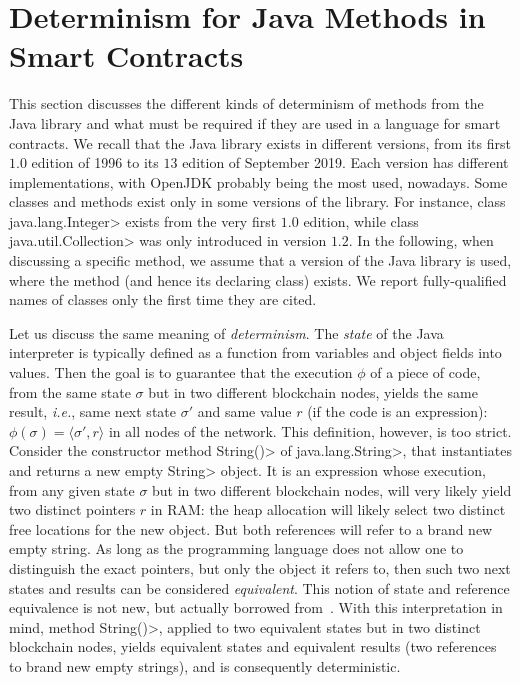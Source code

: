 \section{Determinism for Java Methods in Smart Contracts}\label{sec:determinism}

This section discusses the different kinds of determinism of methods from
the Java library and what must be required if they are used
in a language for smart contracts.
We recall that the Java library exists in different versions, from its first
$1.0$ edition of 1996 to its $13$ edition of September 2019.
Each version has different implementations, with OpenJDK probably being
the most used, nowadays. Some classes and methods exist only in some versions of the library.
For instance, class \<java.lang.Integer> exists from the very first $1.0$ edition,
while class \<java.util.Collection> was only introduced in version $1.2$.
In the following, when discussing a specific method, we assume that a version
of the Java library is used, where the method (and hence its declaring class) exists.
We report fully-qualified names of classes only the first time they are cited.

Let us discuss the same meaning of \emph{determinism}.
The \emph{state} of the Java interpreter is typically defined
as a function from variables and object fields into values.
Then the goal is to guarantee that the execution $\phi$ of a piece of code,
from the same state $\sigma$ but in two different blockchain nodes, yields the same result, \emph{i.e.},
same next state $\sigma'$ and same value $r$ (if the code is an expression):
$\phi(\sigma)=\langle\sigma',r\rangle$ in all nodes of the network.
This definition, however, is too strict. Consider the constructor method
\<String()> of \<java.lang.String>, that instantiates and returns a new empty \<String>
object. It is an expression whose execution,
from any given state $\sigma$ but in two different blockchain nodes,
will very likely yield two distinct
pointers $r$ in RAM: the heap allocation will likely
select two distinct free locations for the new object.
But both references will refer to a brand new empty string.
As long as the programming language does not allow one to distinguish
the exact pointers, but only the object it refers to,
then such two next states and results can be considered \emph{equivalent}.
This notion of state and reference equivalence is not new, but actually borrowed
from~\cite{BanerjeeN05,BarthePR13}.
With this interpretation in mind, method \<String()>, applied to two equivalent
states but in two distinct blockchain nodes,
yields equivalent states and equivalent results (two references to
brand new empty strings), and is consequently deterministic.

